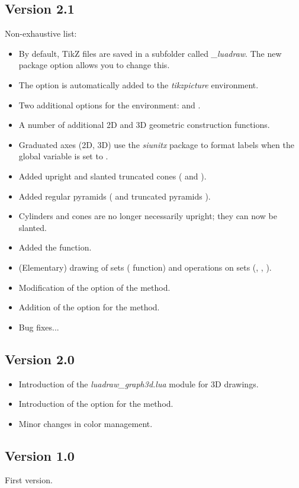 \subsection{Version 2.1}
Non-exhaustive list:
\begin{itemize}
    \item By default, TikZ files are saved in a subfolder called \emph{\_luadraw}. The new package option  allows you to change this.

    \item The  option is automatically added to the \emph{tikzpicture} environment.
    \item Two additional options for the \luadrawenv environment:  and .
    \item A number of additional 2D and 3D geometric construction functions.
    \item Graduated axes (2D, 3D) use the \emph{siunitx} package to format labels when the global variable  is set to \true.

    \item Added upright and slanted truncated cones ( and ).
    \item Added regular pyramids ( and truncated pyramids ).

    \item Cylinders and cones are no longer necessarily upright; they can now be slanted.
    \item Added the  function.

    \item (Elementary) drawing of sets ( function) and operations on sets (, , ).
    \item Modification of the  option of the  method.
    \item Addition of the  option for the  method.
    \item Bug fixes...
\end{itemize}

\subsection{Version 2.0}

\begin{itemize}
    \item Introduction of the \emph{luadraw\_graph3d.lua} module for 3D drawings.
    \item Introduction of the  option for the  method.
    \item Minor changes in color management.
\end{itemize}

\subsection{Version 1.0}
First version.
